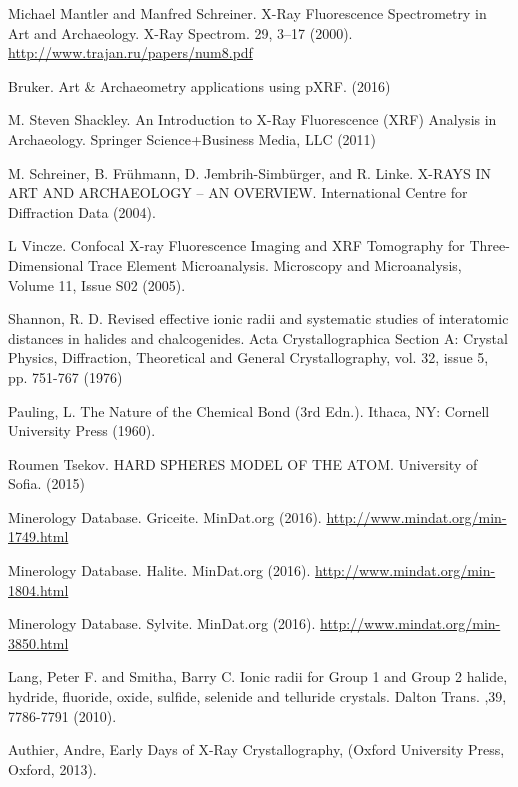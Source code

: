 \documentclass[%
 reprint,
 amsmath,amssymb,
 aps,
 pra,
]{revtex4-1}
\begin{document}
\begin{thebibliography}{6}
	Michael Mantler and Manfred Schreiner. X-Ray Fluorescence Spectrometry in Art and Archaeology. X-Ray Spectrom. 29, 3–17 (2000). \url{http://www.trajan.ru/papers/num8.pdf}
	
	Bruker. Art \& Archaeometry applications using pXRF. (2016)
	
	M. Steven Shackley. An Introduction to X-Ray Fluorescence (XRF) Analysis in Archaeology. Springer Science+Business Media, LLC (2011)
	
	M. Schreiner, B. Frühmann, D. Jembrih-Simbürger, and R. Linke. X-RAYS IN ART AND ARCHAEOLOGY – AN OVERVIEW.  International Centre for Diffraction Data (2004).
	
	L Vincze. Confocal X-ray Fluorescence Imaging and XRF Tomography for Three-Dimensional Trace Element Microanalysis. Microscopy and Microanalysis, Volume 11, Issue S02 (2005).
	
	Shannon, R. D. Revised effective ionic radii and systematic studies of interatomic distances in halides and chalcogenides. Acta Crystallographica Section A: Crystal Physics, Diffraction, Theoretical and General Crystallography, vol. 32, issue 5, pp. 751-767 (1976)
	
	Pauling, L. The Nature of the Chemical Bond (3rd Edn.). Ithaca, NY: Cornell University Press (1960).
	
	Roumen Tsekov. HARD SPHERES MODEL OF THE ATOM. University of Sofia. (2015)
	
	Minerology Database. Griceite. MinDat.org (2016). \url{http://www.mindat.org/min-1749.html}
	
	Minerology Database. Halite. MinDat.org (2016). \url{http://www.mindat.org/min-1804.html}
	
	Minerology Database. Sylvite. MinDat.org (2016). \url{http://www.mindat.org/min-3850.html}
	
	Lang, Peter F. and Smitha, Barry C. Ionic radii for Group 1 and Group 2 halide, hydride, fluoride, oxide, sulfide, selenide and telluride crystals. Dalton Trans. ,39, 7786-7791 (2010).
	
	Authier, Andre, Early Days of X-Ray Crystallography, (Oxford University Press, Oxford, 2013).


\end{thebibliography}
\end{document}
